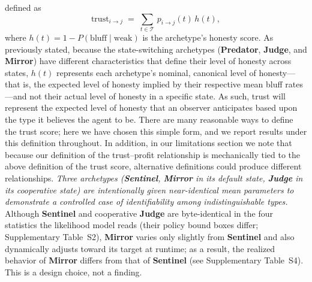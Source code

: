 \documentclass[journal]{IEEEtran}
\newcommand{\arch}[1]{\textbf{#1}}
\begin{document}
defined as
\begin{equation}
  \text{trust}_{i\to j} \;=\;
    \sum_{t\in\mathcal{T}}\, p_{i\to j}(t)\, h(t),
  \label{eq:trust}
\end{equation}
where $h(t) = 1 - P(\text{bluff}\mid\text{weak})$ is the
archetype's honesty
score. As previously stated, because the state-switching archetypes
(\arch{Predator}, \arch{Judge}, and \arch{Mirror}) have different
characteristics that define their level of honesty across states,
$h(t)$ represents each archetype's nominal, canonical level of
honesty---that is, the expected level of honesty implied by their
respective mean bluff rates---and not their actual level of honesty
in a specific state. As such, trust will represent the expected level
of honesty that an observer anticipates based upon the type it
believes the agent to be. There are many reasonable ways to define the trust score;
here we have chosen this simple form, and we report results under
this definition throughout. In addition, in our
limitations section we note that because our definition of the
trust--profit relationship is mechanically tied to the above
definition of the trust score, alternative definitions could
produce different relationships. \textit{Three archetypes
(\arch{Sentinel}, \arch{Mirror} in its default state, \arch{Judge}
in its cooperative state) are intentionally given near-identical mean
parameters to demonstrate a controlled case of identifiability among
indistinguishable types.} Although \arch{Sentinel} and cooperative \arch{Judge} are byte-identical
in the four statistics the likelihood model reads (their policy bound boxes
differ; Supplementary Table~S2), \arch{Mirror} varies only slightly from \arch{Sentinel} and also dynamically
adjusts toward its target at runtime; as a result, the realized
behavior of \arch{Mirror} differs from that of \arch{Sentinel}
(see Supplementary Table~S4).
This is a design choice, not a finding.
\end{document}
